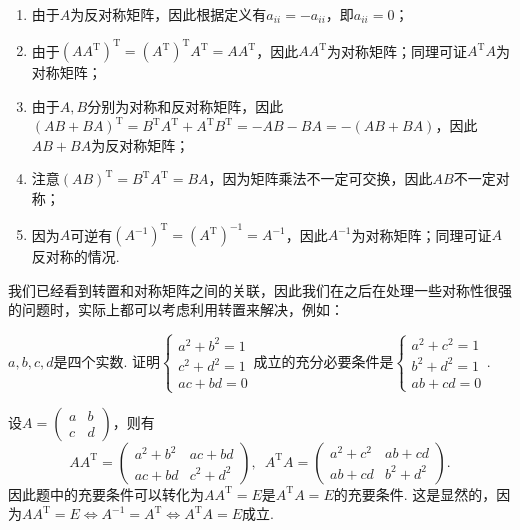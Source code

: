 \begin{solution}
    \begin{enumerate}
        \item 由于$A$为反对称矩阵，因此根据定义有$a_{ii}=-a_{ii}$，即$a_{ii}=0$；

        \item 由于$(AA^\mathrm{T})^\mathrm{T}=(A^\mathrm{T})^\mathrm{T}A^\mathrm{T}=AA^\mathrm{T}$，因此$AA^\mathrm{T}$为对称矩阵；同理可证$A^\mathrm{T}A$为对称矩阵；

        \item 由于$A,B$分别为对称和反对称矩阵，因此$(AB+BA)^\mathrm{T}=B^\mathrm{T}A^\mathrm{T}+A^\mathrm{T}B^\mathrm{T}=-AB-BA=-(AB+BA)$，因此$AB+BA$为反对称矩阵；

        \item 注意$(AB)^\mathrm{T}=B^\mathrm{T}A^\mathrm{T}=BA$，因为矩阵乘法不一定可交换，因此$AB$不一定对称；

        \item 因为$A$可逆有$(A^{-1})^\mathrm{T}=(A^\mathrm{T})^{-1}=A^{-1}$，因此$A^{-1}$为对称矩阵；同理可证$A$反对称的情况.
    \end{enumerate}
\end{solution}

我们已经看到转置和对称矩阵之间的关联，因此我们在之后在处理一些对称性很强的问题时，实际上都可以考虑利用转置来解决，例如：
\begin{example}
    $a,b,c,d$是四个实数. 证明$\begin{cases}
            a^2+b^2=1 \\
            c^2+d^2=1 \\
            ac+bd=0
        \end{cases}$成立的充分必要条件是$\begin{cases}
            a^2+c^2=1 \\
            b^2+d^2=1 \\
            ab+cd=0
        \end{cases}$.
\end{example}

\begin{solution}
    设$A=\begin{pmatrix}
            a & b \\ c & d
        \end{pmatrix}$，则有
    \[AA^\mathrm{T}=\begin{pmatrix}
            a^2+b^2 & ac+bd \\ ac+bd & c^2+d^2
        \end{pmatrix},\enspace A^\mathrm{T}A=\begin{pmatrix}
            a^2+c^2 & ab+cd \\ ab+cd & b^2+d^2
        \end{pmatrix}.\]
    因此题中的充要条件可以转化为$AA^\mathrm{T}=E$是$A^\mathrm{T}A=E$的充要条件. 这是显然的，因为$AA^\mathrm{T}=E\iff A^{-1}=A^\mathrm{T}\iff A^\mathrm{T}A=E$成立.
\end{solution}

